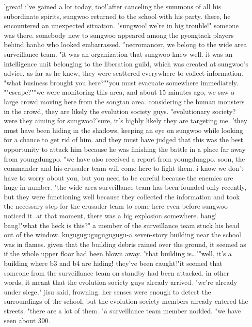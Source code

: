 'great! i've gained a lot today, too!'after canceling the summons of all his subordinate spirits, sungwoo returned to the school with his party.
 there, he encountered an unexpected situation.
"sungwoo! we're in big trouble!" someone was there.
 somebody new to sungwoo appeared among the pyongtaek players behind hanho who looked embarrassed.
"necromancer, we belong to the wide area surveillance team.
"it was an organization that sungwoo knew well.
 it was an intelligence unit belonging to the liberation guild, which was created at sungwoo's advice.
 as far as he knew, they were scattered everywhere to collect information.
"what business brought you here?""you must evacuate somewhere immediately.
""escape?""we were monitoring this area, and about 15 minutes ago, we saw a large crowd moving here from the songtan area.
 considering the human monsters in the crowd, they are likely the evolution society guys.
"evolutionary society? were they aiming for sungwoo?'sure, it's highly likely they are targeting me.
'they must have been hiding in the shadows, keeping an eye on sungwoo while looking for a chance to get rid of him.
and they must have judged that this was the best opportunity to attack him because he was finishing the battle in a place far away from youngdungpo.
"we have also received a report from youngdungpo.
 soon, the commander and his crusader team will come here to fight them.
 i know we don't have to worry about you, but you need to be careful because the enemies are huge in number.
"the wide area surveillance team has been founded only recently, but they were functioning well because they collected the information and took the necessary step for the crusader team to come here even before sungwoo noticed it.
at that moment, there was a big explosion somewhere.
 bang! bang!"what the heck is this?" a member of the surveillance team stuck his head out of the window.
kugugugugugugugugu-a seven-story building near the school was in flames.
 given that the building debris rained over the ground, it seemed as if the whole upper floor had been blown away.
"that building is…""well, it's a building where b3 and b4 are hiding! they've been caught!"it seemed that someone from the surveillance team on standby had been attacked.
in other words, it meant that the evolution society guys already arrived.
"we're already under siege," jisu said, frowning.
 her senses were enough to detect the surroundings of the school, but the evolution society members already entered the streets.
"there are a lot of them.
"a surveillance team member nodded.
"we have seen about 300.

